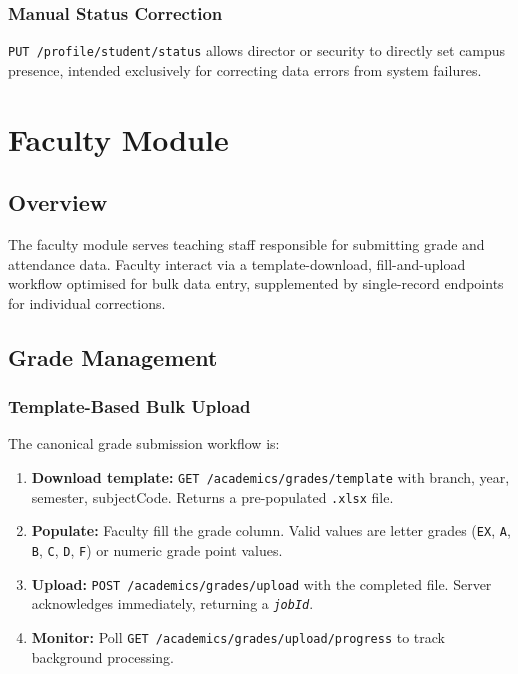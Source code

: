\documentclass[12pt,a4paper]{report}
\newcommand{\api}[1]{\texttt{\small #1}}
\newcommand{\field}[1]{\texttt{\textit{#1}}}
\newcommand{\code}[1]{\texttt{#1}}
\begin{document}
\subsection{Manual Status Correction}

\api{PUT /profile/student/status} allows director or security to directly set campus presence, intended exclusively for correcting data errors from system failures.

\chapter{Faculty Module}

\section{Overview}

The faculty module serves teaching staff responsible for submitting grade and attendance data. Faculty interact via a template-download, fill-and-upload workflow optimised for bulk data entry, supplemented by single-record endpoints for individual corrections.

\section{Grade Management}

\subsection{Template-Based Bulk Upload}

The canonical grade submission workflow is:
\begin{enumerate}[label=(\arabic*)]
  \item \textbf{Download template:} \api{GET /academics/grades/template} with branch, year, semester, subjectCode. Returns a pre-populated \code{.xlsx} file.
  \item \textbf{Populate:} Faculty fill the grade column. Valid values are letter grades (\code{EX}, \code{A}, \code{B}, \code{C}, \code{D}, \code{F}) or numeric grade point values.
  \item \textbf{Upload:} \api{POST /academics/grades/upload} with the completed file. Server acknowledges immediately, returning a \field{jobId}.
  \item \textbf{Monitor:} Poll \api{GET /academics/grades/upload/progress} to track background processing.
\end{enumerate}
\end{document}
